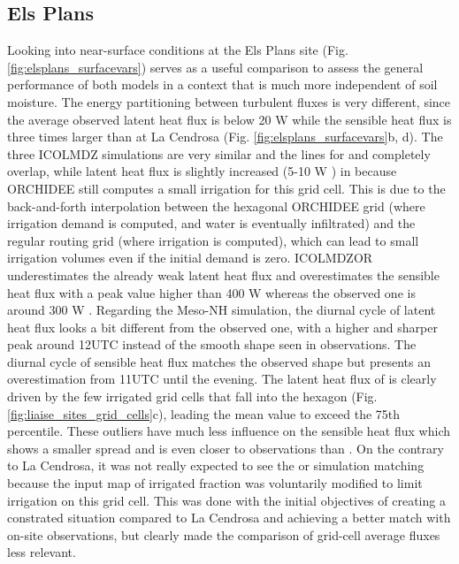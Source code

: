 \subsection*{Els Plans}
Looking into near-surface conditions at the Els Plans site (Fig. \ref{fig:elsplans_surfacevars}) serves as a useful comparison to assess the general performance of both models in a context that is much more independent of soil moisture.
The energy partitioning between turbulent fluxes is very different, since the average observed latent heat flux is below 20 W \persqm while the sensible heat flux is three times larger than at La Cendrosa (Fig. \ref{fig:elsplans_surfacevars}b, d). 
The three ICOLMDZ simulations are very similar and the lines for \noirr and \irr completely overlap, while latent heat flux is slightly increased (5-10 W \persqm) in \irrboost because ORCHIDEE still computes a small irrigation for this grid cell. This is due to the back-and-forth interpolation between the hexagonal ORCHIDEE grid (where irrigation demand is computed, and water is eventually infiltrated) and the regular routing grid (where irrigation is computed), which can lead to small irrigation volumes even if the initial demand is zero.
ICOLMDZOR underestimates the already weak latent heat flux and overestimates the sensible heat flux with a peak value higher than 400 W \persqm whereas the observed one is around 300 W \persqm. 
Regarding the Meso-NH simulation, the \mesoexact diurnal cycle of latent heat flux looks a bit different from the observed one, with a higher and sharper peak around 12UTC instead of the smooth shape seen in observations. The diurnal cycle of sensible heat flux matches the observed shape but presents an overestimation from 11UTC until the evening.
The latent heat flux of \mesomean is clearly driven by the few irrigated grid cells that fall into the hexagon (Fig. \ref{fig:liaise_sites_grid_cells}c), leading the mean value to exceed the 75th percentile. These outliers have much less influence on the sensible heat flux which shows a smaller spread and is even closer to observations than \mesoexact.
On the contrary to La Cendrosa, it was not really expected to see the \irr or \irrboost simulation matching \mesomean because the input map of irrigated fraction was voluntarily modified to limit irrigation on this grid cell. This was done with the initial objectives of creating a constrated situation compared to La Cendrosa and achieving a better match with on-site observations, but clearly made the comparison of grid-cell average fluxes less relevant.

